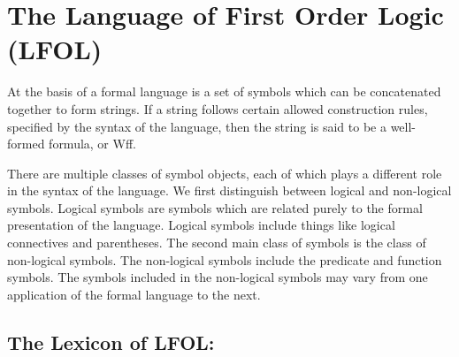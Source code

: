 \documentclass[12pt]{article}
\begin{document}
\newpage
\section{The Language of First Order Logic (LFOL)}

At the basis of a formal language is a set of symbols which can be concatenated together to form strings.
If a string follows certain allowed construction rules, specified by the syntax of the language, then the string is said to be a well-formed formula, or Wff.

There are multiple classes of symbol objects, each of which plays a different role in the syntax of the language. 
We first distinguish between logical and non-logical symbols. 
Logical symbols are symbols which are related purely to the formal presentation of the language.
Logical symbols include things like logical connectives and parentheses.
The second main class of symbols is the class of non-logical symbols.
The non-logical symbols include the predicate and function symbols.
The symbols included in the non-logical symbols may vary from one application of the formal language to the next.


\subsection{The Lexicon of LFOL:}

\noindent{}
\end{document}
